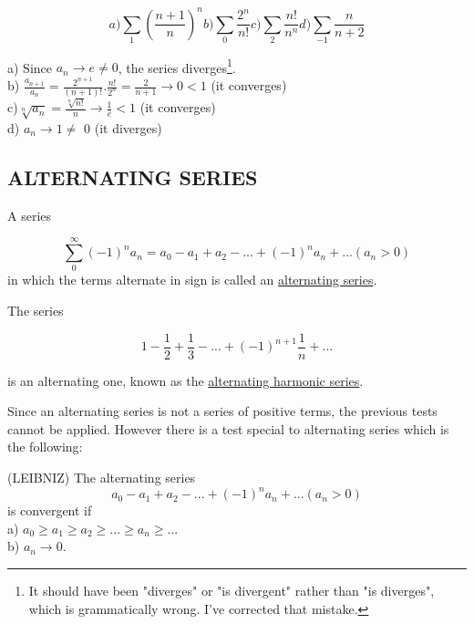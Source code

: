 \documentclass[11pt]{amsbook}
\begin{document}

	\[
    	a) \sum_{1}^{}(\frac{n+1}{n})^{n} b) \sum_{0}^{}\frac{2^n}{n!} c) \sum_{2}^{}\frac{n!}{n^n} d) \sum_{-1}^{}\frac{n}{n+2}
	\]

\begin{hSolution}
a) Since $a_n \rightarrow e \neq 0$, the series diverges\footnote{\label{1}It should have been "diverges" or "is divergent" rather than "is diverges", which is grammatically wrong. I've corrected that mistake.}. \\
b) $\frac{a_{n+1}}{a_n} = \frac{2^{n+1}}{(n+1)!} . \frac{n!}{2^n} = \frac{2}{n+1} \rightarrow 0 < 1$ (it converges) \\
c)$\sqrt[n]{a_n} = \frac{\sqrt[n]{n!}}{n} \rightarrow \frac{1}{e} < 1$ (it converges) \\
d) $a_n \rightarrow 1 \neq$ 0 (it diverges)  
\end{hSolution}

\subsection{ALTERNATING SERIES}
A series

	\[
		\sum_{0}^{\infty} (-1)^n a_n = a_0 - a_1 + a_2 - ... + (-1)^n a_n + ... (a_n > 0)
	\]
in which the terms alternate in sign is called an \underline{alternating series}.
\par The series
	
	\[
		1 - \frac{1}{2} + \frac{1}{3} - ... + (-1)^{n+1} \frac{1}{n} + ...
	\]

is an alternating one, known as the \underline{alternating harmonic series}.
\par Since an alternating series is not a series of positive terms, the previous tests cannot be applied. However there is a test special to alternating series which is the following:
\begin{thm}{(LEIBNIZ)}
The alternating series
		\[
			a_0 - a_1 + a_2 - ... + (-1)^n a_n  + ... (a_n > 0)
		\]
is convergent if \\
a) $a_0 \geq a_1 \geq a_2 \geq ... \geq a_n \geq ...$ \\
b) $a_n \rightarrow 0$.
\end{thm}
\end{document}
